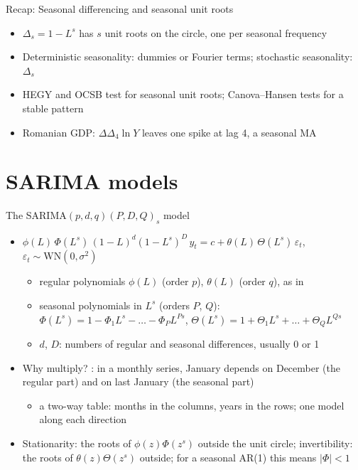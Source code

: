 \begin{frame}{Recap: Seasonal differencing and seasonal unit roots}
\itemsize{\small}
\begin{itemize}
    \item $\Delta_s = 1 - L^s$ has $s$ unit roots on the circle, one per seasonal frequency
    \item Deterministic seasonality: dummies or Fourier terms; stochastic seasonality: $\Delta_s$
    \item HEGY and OCSB test for seasonal unit roots; Canova--Hansen tests for a stable pattern
    \item Romanian GDP: $\Delta\Delta_4\ln Y$ leaves one spike at lag 4, a seasonal MA
\end{itemize}
\end{frame}


\section{SARIMA models}

\begin{frame}{The SARIMA$(p,d,q)(P,D,Q)_s$ model}
\itemsize{\small}
\begin{itemize}
    \item $\phi(L)\,\Phi(L^s)\,(1 - L)^d(1 - L^s)^D\,y_t = c + \theta(L)\,\Theta(L^s)\,\varepsilon_t$, $\varepsilon_t \sim \mathrm{WN}(0, \sigma^2)$
    \begin{itemize}
        \item regular polynomials $\phi(L)$ (order $p$), $\theta(L)$ (order $q$), as in 
        \item seasonal polynomials in $L^s$ (orders $P$, $Q$): $\Phi(L^s) = 1 - \Phi_1L^s - \dots - \Phi_PL^{Ps}$, $\Theta(L^s) = 1 + \Theta_1L^s + \dots + \Theta_QL^{Qs}$
        \item $d$, $D$: numbers of regular and seasonal differences, usually 0 or 1
    \end{itemize}
    \item Why multiply? : in a monthly series, January depends on December (the regular part) and on last January (the seasonal part)
    \begin{itemize}
        \item a two-way table: months in the columns, years in the rows; one model along each direction
    \end{itemize}
    \item Stationarity: the roots of $\phi(z)\Phi(z^s)$ outside the unit circle; invertibility: the roots of $\theta(z)\Theta(z^s)$ outside; for a seasonal AR(1) this means $|\Phi| < 1$
\end{itemize}
\end{frame}

